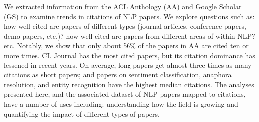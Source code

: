 We extracted information from the ACL Anthology (AA) and Google Scholar (GS) to examine trends in citations of NLP papers. We explore questions such as: how well cited are papers of different types (journal articles, conference papers, demo papers, etc.)? how well cited are papers from different areas of within NLP? etc. Notably, we show that only about 56\% of the papers in AA are cited ten or more times. CL Journal has the most cited papers, but its citation dominance has lessened in recent years. On average, long papers get almost three times as many citations as short papers; and papers on sentiment classification, anaphora resolution, and entity recognition have the highest median citations. The analyses presented here, and the associated dataset of NLP papers mapped to citations, have a number of uses including: understanding how the field is growing and quantifying the impact of different types of papers.
